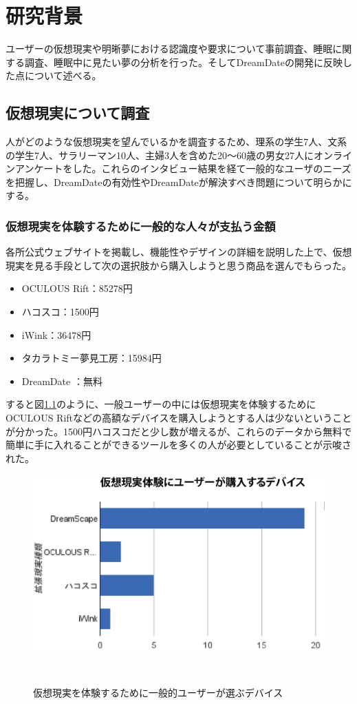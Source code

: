 \chapter{研究背景}
\label{chap:webapi}

 ユーザーの仮想現実や明晰夢における認識度や要求について事前調査、睡眠に関する調査、睡眠中に見たい夢の分析を行った。そしてDreamDateの開発に反映した点について述べる。

\section{仮想現実について調査}
人がどのような仮想現実を望んでいるかを調査するため、理系の学生7人、文系の学生7人、サラリーマン10人、主婦3人を含めた20〜60歳の男女27人にオンラインアンケートをした。これらのインタビュー結果を経て一般的なユーザのニーズを把握し、DreamDateの有効性やDreamDateが解決すべき問題について明らかにする。

\subsection{仮想現実を体験するために一般的な人々が支払う金額}
各所公式ウェブサイトを掲載し、機能性やデザインの詳細を説明した上で、仮想現実を見る手段として次の選択肢から購入しようと思う商品を選んでもらった。

\begin{itemize}
\item OCULOUS Rift：85278円
\item ハコスコ：1500円
\item iWink：36478円
\item タカラトミー夢見工房：15984円
\item DreamDate ：無料
\end{itemize}

すると図\ref{userNeedCost}のように、一般ユーザーの中には仮想現実を体験するためにOCULOUS Riftなどの高額なデバイスを購入しようとする人は少ないということが分かった。1500円ハコスコだと少し数が増えるが、これらのデータから無料で簡単に手に入れることができるツールを多くの人が必要としていることが示唆された。

\begin{figure}[htbp]
\begin{center}
\includegraphics[width=15cm]{eps/VRselection.eps}
\caption{仮想現実を体験するために一般的ユーザーが選ぶデバイス}
　\label{userNeedCost}
\end{center}
\end{figure}

